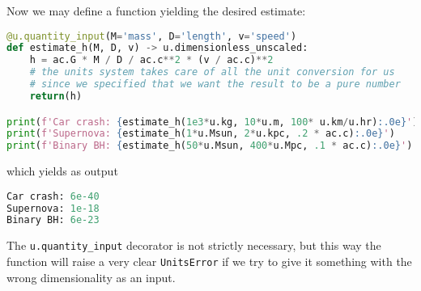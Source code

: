 \documentclass[main.tex]{subfiles}
\begin{document}
Now we may define a function yielding the desired estimate: 
\begin{lstlisting}[language=Python]
@u.quantity_input(M='mass', D='length', v='speed')
def estimate_h(M, D, v) -> u.dimensionless_unscaled:
    h = ac.G * M / D / ac.c**2 * (v / ac.c)**2
    # the units system takes care of all the unit conversion for us
    # since we specified that we want the result to be a pure number
    return(h)

print(f'Car crash: {estimate_h(1e3*u.kg, 10*u.m, 100* u.km/u.hr):.0e}')
print(f'Supernova: {estimate_h(1*u.Msun, 2*u.kpc, .2 * ac.c):.0e}')
print(f'Binary BH: {estimate_h(50*u.Msun, 400*u.Mpc, .1 * ac.c):.0e}')
\end{lstlisting}
%
which yields as output
\begin{lstlisting}[language=Python]
Car crash: 6e-40
Supernova: 1e-18
Binary BH: 6e-23
\end{lstlisting}

The \texttt{u.quantity\_input} decorator is not strictly necessary, but this way the function will raise a very clear \texttt{UnitsError} if we try to give it something with the wrong dimensionality as an input.

\end{document}
